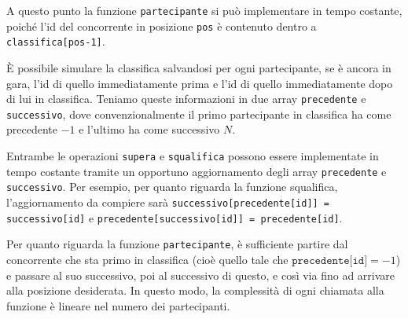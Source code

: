 A questo punto la funzione \texttt{partecipante} si può implementare in tempo costante, poiché l'id del concorrente in posizione \texttt{pos} è contenuto dentro a \texttt{classifica[pos-1]}.


\Lista

È possibile simulare la classifica salvandosi per ogni partecipante, se è ancora in gara, l'id di quello immediatamente prima e l'id di quello immediatamente dopo di lui in classifica. Teniamo queste informazioni in due array \texttt{precedente} e \texttt{successivo}, dove convenzionalmente il primo partecipante in classifica ha come precedente $-1$ e l'ultimo ha come successivo $N$.

Entrambe le operazioni \texttt{supera} e \texttt{squalifica} possono essere implementate in tempo costante tramite un opportuno aggiornamento degli array \texttt{precedente} e \texttt{successivo}.
Per esempio, per quanto riguarda la funzione squalifica, l'aggiornamento da compiere sarà \texttt{successivo[precedente[id]] = successivo[id]} e \texttt{precedente[successivo[id]] = precedente[id]}.



Per quanto riguarda la funzione \texttt{partecipante}, è sufficiente partire dal concorrente che sta primo in classifica (cioè quello tale che $\texttt{precedente[id]} = -1$) e passare al suo successivo, poi al successivo di questo, e così via fino ad arrivare alla posizione desiderata. In questo modo, la complessità di ogni chiamata alla funzione è lineare nel numero dei partecipanti.

